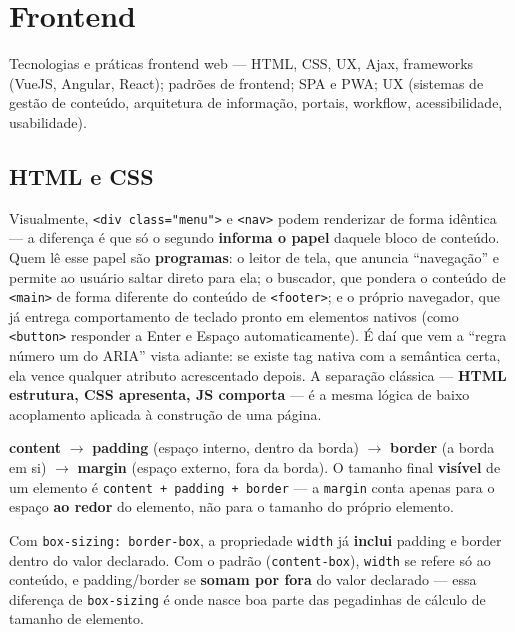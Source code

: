 \chapter{Frontend}
\label{cap:frontend-teoria}

\begin{edital}
Tecnologias e práticas frontend web --- HTML, CSS, UX, Ajax, frameworks
(VueJS, Angular, React); padrões de frontend; SPA e PWA; UX (sistemas de
gestão de conteúdo, arquitetura de informação, portais, workflow,
acessibilidade, usabilidade).
\end{edital}

\section{HTML e CSS}

\begin{conceito}
Visualmente, \texttt{<div class="menu">} e \texttt{<nav>} podem
renderizar de forma idêntica --- a diferença é que só o segundo
\textbf{informa o papel} daquele bloco de conteúdo. Quem lê esse papel
são \textbf{programas}: o leitor de tela, que anuncia “navegação” e
permite ao usuário saltar direto para ela; o buscador, que pondera o
conteúdo de \texttt{<main>} de forma diferente do conteúdo de
\texttt{<footer>}; e o próprio navegador, que já entrega comportamento de
teclado pronto em elementos nativos (como \texttt{<button>} responder a
Enter e Espaço automaticamente). É daí que vem a “regra número um do
ARIA” vista adiante: se existe tag nativa com a semântica certa, ela
vence qualquer atributo acrescentado depois. A separação clássica ---
\textbf{HTML estrutura, CSS apresenta, JS comporta} --- é a mesma lógica
de baixo acoplamento aplicada à construção de uma página.
\end{conceito}

\begin{conceito}
\textbf{content} $\to$ \textbf{padding} (espaço interno, dentro da
borda) $\to$ \textbf{border} (a borda em si) $\to$ \textbf{margin}
(espaço externo, fora da borda). O tamanho final \textbf{visível} de um
elemento é \texttt{content + padding + border} --- a \texttt{margin} conta
apenas para o espaço \textbf{ao redor} do elemento, não para o tamanho do
próprio elemento.

Com \texttt{box-sizing: border-box}, a propriedade \texttt{width} já
\textbf{inclui} padding e border dentro do valor declarado. Com o padrão
(\texttt{content-box}), \texttt{width} se refere só ao conteúdo, e
padding/border se \textbf{somam por fora} do valor declarado --- essa
diferença de \texttt{box-sizing} é onde nasce boa parte das pegadinhas de
cálculo de tamanho de elemento.
\end{conceito}

